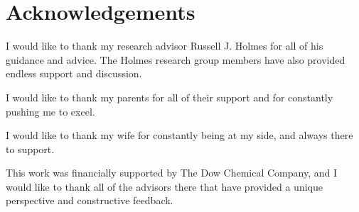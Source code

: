 \documentclass[../thesis.tex]{subfiles}
\begin{document}
\section*{Acknowledgements}

I would like to thank my research advisor Russell J. Holmes for all of his guidance and advice.
The Holmes research group members have also provided endless support and discussion.

I would like to thank my parents for all of their support and for constantly pushing me to excel.

I would like to thank my wife for constantly being at my side, and always there to support.

This work was financially supported by The Dow Chemical Company, and I would like to thank all of the advisors there that have provided a unique perspective and constructive feedback.

\pagebreak
\end{document}
